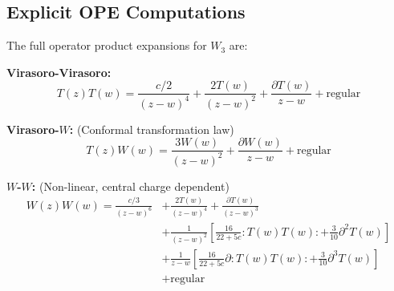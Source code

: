 \subsection{Explicit OPE Computations}

\begin{theorem}
\label{thm:w3-ope-complete}
The full operator product expansions for $W_3$ are:

\textbf{Virasoro-Virasoro:}
\begin{equation}
T(z)T(w) = \frac{c/2}{(z-w)^4} + \frac{2T(w)}{(z-w)^2} + \frac{\partial T(w)}{z-w} + \text{regular}
\end{equation}

\textbf{Virasoro-$W$:} (Conformal transformation law)
\begin{equation}
T(z)W(w) = \frac{3W(w)}{(z-w)^2} + \frac{\partial W(w)}{z-w} + \text{regular}
\end{equation}

\textbf{$W$-$W$:} (Non-linear, central charge dependent)
\begin{align}
W(z)W(w) = \frac{c/3}{(z-w)^6} &+ \frac{2T(w)}{(z-w)^4} + \frac{\partial T(w)}{(z-w)^3} \nonumber \\
&+ \frac{1}{(z-w)^2}\left[\frac{16}{22+5c} : T(w)T(w) : + \frac{3}{10}\partial^2 T(w)\right] \nonumber \\
&+ \frac{1}{z-w}\left[\frac{16}{22+5c}\partial : T(w)T(w) : + \frac{3}{10}\partial^3 T(w)\right] \nonumber \\
&+ \text{regular}
\end{align}
\end{theorem}

